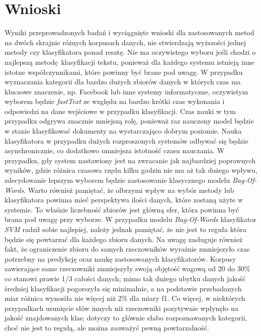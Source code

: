 \section{Wnioski}
Wyniki przeprowadzonych badań i wyciągnięte wnioski dla zastosowanych metod na dwóch skrajnie różnych korpusach danych, nie stwierdzają wyższości jednej metody czy klasyfikatora ponad resztę. Nie ma oczywistego wyboru jeśli chodzi o najlepszą metodę klasyfikacji tekstu, ponieważ dla każdego systemu istnieją inne istotne współczynnikami, które powinny być brane pod uwagę. W przypadku wyznaczania kategorii dla bardzo dużych zbiorów danych w których czas ma kluczowe znaczenie, np. Facebook lub inne systemy informatyczne, oczywistym wyborem będzie \textit{fastText} ze względu na bardzo krótki czas wykonania i odpowiedzi na dane wejściowe w przypadku klasyfikacji. Czas nauki w tym przypadku odgrywa znacznie mniejszą rolę, ponieważ raz nauczony model będzie w stanie klasyfikować dokumenty na wystarczająco dobrym poziomie. Nauka klasyfikatora w przypadku dużych rozproszonych systemów odbywać się będzie asynchronicznie, co dodatkowo umniejsza istotność czasu nauczania. W przypadku, gdy system nastawiony jest na zwracanie jak najbardziej poprawnych wyników, gdzie różnica czasowa rzędu kilku godzin nie ma aż tak dużego wpływu, zdecydowanie lepszym wyborem będzie zastosowanie klasycznego modelu \textit{Bag-Of-Words}. Warto również pamiętać, że olbrzymi wpływ na wybór metody lub klasyfikatora powinna mieć perspektywa ilości danych, które zostaną użyte w systemie. To właśnie liczebność zbiorów jest główną sfer, która powinna być brana pod uwagę przy wyborze. W przypadku modelu \textit{Bag-Of-Words} klasyfikator \textit{SVM} radził sobie najlepiej, należy jednak pamiętać, że nie jest to reguła która będzie się powtarzać dla każdego zbioru danych. Na uwagę zasługuje również fakt, że ograniczenie zbioru do samych rzeczowników wyraźnie zmniejszyło czas potrzebny na predykcję oraz naukę zastosowanych klasyfikatorów. Korpusy zawierające same rzeczowniki zmniejszyły swoją objętość wagową od 20 do 30\% co stanowi prawie 1/3 całości danych; mimo tak dużego ubytku danych jakość średniej klasyfikacji pogorszyła się minimalnie, a na podstawie przebadanych miar różnica wynosiła nie więcej niż 2\% dla miary f1. Co więcej, w niektórych przypadkach usunięcie słów innych niż rzeczowniki pozytywnie wpłynęło na jakość znajdowanych klas; dotyczy to głównie słabo rozpoznawanych kategorii, choć nie jest to regułą, ale można zauważyć pewną powtarzalność.
